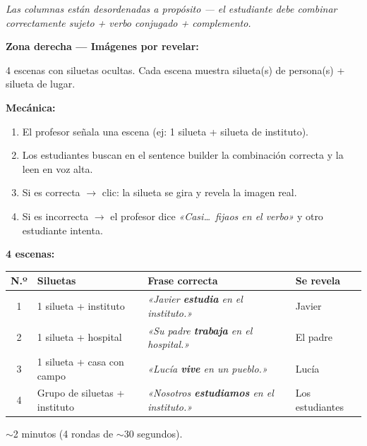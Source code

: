\documentclass[a4paper,10pt]{article}
\renewcommand{\arraystretch}{1.3}
\begin{document}
\vspace{0.2cm}

{\small\textit{Las columnas están desordenadas a propósito — el estudiante debe combinar correctamente sujeto + verbo conjugado + complemento.}}

\vspace{0.5cm}


\noindent\textcolor{azulprincipal}{\textbf{\large Zona derecha — Imágenes por revelar:}}

\vspace{0.2cm}

{\small 4 escenas con siluetas ocultas. Cada escena muestra silueta(s) de persona(s) + silueta de lugar.}

\vspace{0.3cm}

\noindent\textcolor{azulprincipal}{\textbf{Mecánica:}}
\begin{enumerate}[leftmargin=2em, itemsep=3pt]
\item El profesor señala una escena (ej: 1 silueta + silueta de instituto).
\item Los estudiantes buscan en el sentence builder la combinación correcta y la leen en voz alta.
\item Si es correcta $\rightarrow$ clic: la silueta se gira y revela la imagen real.
\item Si es incorrecta $\rightarrow$ el profesor dice \textit{«Casi\ldots\ fijaos en el verbo»} y otro estudiante intenta.
\end{enumerate}

\vspace{0.4cm}

\noindent\textcolor{azulprincipal}{\textbf{\large 4 escenas:}}

\vspace{0.3cm}

\renewcommand{\arraystretch}{1.6}
\begin{center}
\begin{tabular}{|c|p{4cm}|p{6.5cm}|p{2.5cm}|}
\hline
\rowcolor{azulprincipal!15}
\textbf{N.º} & \textbf{Siluetas} & \textbf{Frase correcta} & \textbf{Se revela} \\
\hline
1 & 1 silueta + instituto & \textit{«Javier \textbf{estudia} en el instituto.»} & Javier \\
\hline
\rowcolor{gris}
2 & 1 silueta + hospital & \textit{«Su padre \textbf{trabaja} en el hospital.»} & El padre \\
\hline
3 & 1 silueta + casa con campo & \textit{«Lucía \textbf{vive} en un pueblo.»} & Lucía \\
\hline
\rowcolor{gris}
4 & Grupo de siluetas + instituto & \textit{«Nosotros \textbf{estudiamos} en el instituto.»} & Los estudiantes \\
\hline
\end{tabular}
\end{center}

\vspace{0.3cm}

\begin{notabox}[Duración]
{\small $\sim$2 minutos (4 rondas de $\sim$30 segundos).}
\end{notabox}
\end{document}
